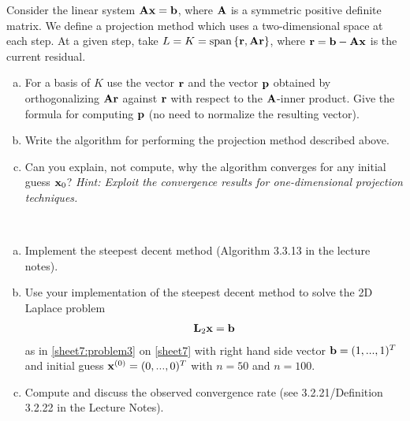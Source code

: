 \begin{Sheet}
  \begin{Problem}
    Consider the linear system $\mathbf A\mathbf x = \mathbf b$, where $\mathbf A$ is a
    symmetric positive definite matrix. We define a projection method
    which uses a two-dimensional space at each step. At a given step,
    take $L = K = \operatorname{span}\left\{\mathbf r, \mathbf A\mathbf r\right\}$, where $\mathbf r = \mathbf b - \mathbf A\mathbf x$
    is the current residual.
    \begin{enumerate}[(a)]
    \item For a basis of $K$ use the vector $\mathbf r$ and the vector $\mathbf p$
      obtained by orthogonalizing $\mathbf A\mathbf r$ against $\mathbf r$ with
      respect to the $\mathbf A$-inner product. Give the formula for
      computing $\mathbf p$ (no need to normalize the resulting vector).
    \item Write the algorithm for performing the projection method
      described above.
    \item Can you explain, not compute, why the algorithm converges for any initial guess $\mathbf x_0$?
     \textit{Hint: Exploit the convergence
        results for one-dimensional projection techniques.}
    \end{enumerate}
  \end{Problem}

  \begin{Problem}[Programming]
    \label{sheet8:problem3}
    \hfill\\\vspace{-6ex}
    \begin{enumerate}[(a)]
    \item Implement the steepest decent method (Algorithm 3.3.13 in the
      lecture notes).
    \item Use your implementation of the steepest decent method to
      solve the 2D Laplace problem
      \begin{gather*}
        \mathbf L_2\mathbf x=\mathbf b
      \end{gather*}
      as in \cref{sheet7:problem3} on \cref{sheet7} with right hand
      side vector $\mathbf b=(1,...,1)^T$ and initial guess
      $\mathbf x^{(0)}=(0,...,0)^T$ with $n=50$ and $n=100$. 
    \item Compute and discuss the observed convergence rate (see 3.2.21/Definition 3.2.22 in the Lecture Notes).
    \end{enumerate}
  \end{Problem}



\end{Sheet}
